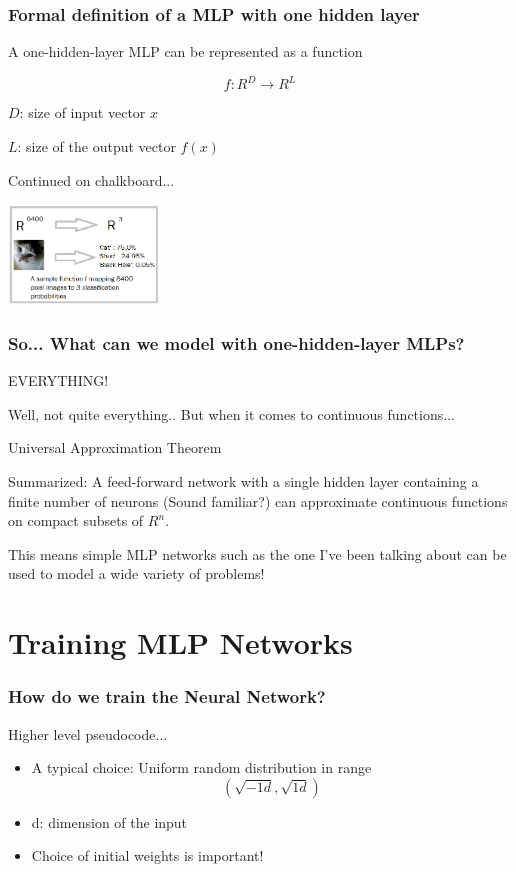 \documentclass{beamer}
\begin{document}
\begin{frame}  
    \frametitle{Formal definition of a MLP with one hidden layer}
    \begin{block}{A one-hidden-layer MLP can be represented as a function}
        \item$$f: R^D \rightarrow R^L$$
        \item $D$: size of input vector $x$
        \item $L$: size of the output vector $f(x)$
        \item Continued on chalkboard...
        \end{block}
    \includegraphics[width=4cm]{sample_f.png}
\end{frame}
\begin{frame}
    \frametitle{So... What can we model with one-hidden-layer MLPs?}
    \begin{block}{EVERYTHING!}
    \item Well, not quite everything.. But when it comes to continuous functions...
    \item Universal Approximation Theorem
    \item Summarized: A feed-forward network with a single hidden layer containing a finite number of neurons (Sound familiar?) can approximate continuous functions on compact subsets of $R^n$. 
    \item This means simple MLP networks such as the one I've been talking about can be used to model a wide variety of problems!
    \end{block}
\end{frame}
\section{Training MLP Networks}
\begin{frame}
    \frametitle{How do we train the Neural Network?}
    \begin{block}{Higher level pseudocode...}
    \begin{itemize}
    \item A typical choice: Uniform random distribution in range $$(\sqrt{-1d},\sqrt{1d})$$
    \item d: dimension of the input
    \item Choice of initial weights is important!
    \end{itemize}
    \end{block}    
\end{frame}
\end{document}
